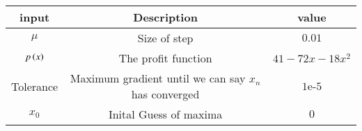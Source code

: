 \begin{tabular}[10pt]{ |c| c| c|}
    \hline
    \textbf{input}&\textbf{Description}&\textbf{value}\\
    \hline 
    $\mu$&Size of step&$0.01$\\
    \hline
    $p\left(x\right)$&The profit function&$41-72x-18x^2$\\
    \hline
    Tolerance&Maximum gradient until we can say $x_n$ has converged&$1\text{e-}5$\\
    \hline 
    $x_0$&Inital Guess of maxima&$0$\\
    \hline 
    \end{tabular}
